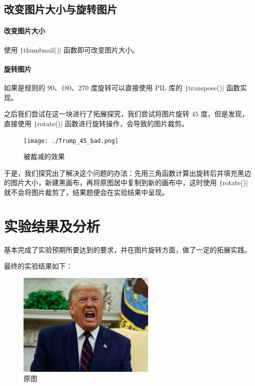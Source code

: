 \documentclass[11pt]{ctexart}
\begin{document}
\subsection{改变图片大小与旋转图片}

\paragraph{改变图片大小}

使用 \texttt|thumbnail()| 函数即可改变图片大小。

\paragraph{旋转图片}

如果是规则的 $90$、$180$、$270$ 度旋转可以直接使用 PIL 库的 \texttt|transpose()| 函数实现。

之后我们尝试在这一块进行了拓展探究，我们尝试将图片旋转 $45$ 度，但是发现，直接使用 \texttt|rotate()| 函数进行旋转操作，会导致的图片裁剪。

  \begin{figure}[htbp]
        \centering
        \texttt{[image: ./Trump\_45\_bad.png]}
        \caption{被裁减的效果}\label{fig:digit}
  \end{figure}

于是，我们探究出了解决这个问题的办法：先用三角函数计算出旋转后并填充黑边的图片大小，新建黑画布，再将原图居中复制到新的画布中，这时使用 \texttt|rotate()| 就不会将图片裁剪了，结果题便会在实验结果中呈现。

\section{实验结果及分析}

基本完成了实验预期所要达到的要求，并在图片旋转方面，做了一定的拓展实践。

最终的实验结果如下：


  \begin{figure}[htbp]
        \centering
        \includegraphics[width=0.6\textwidth]{./Trump.jpg}
        \caption{原图}\label{fig:digit}
  \end{figure}
  
\end{document}
